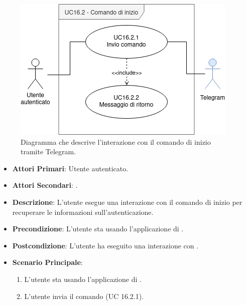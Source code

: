 	\begin{figure}[H]
		\centering
		\includegraphics[scale=0.60]{res/images/uc16.2}
		\caption{Diagramma che descrive l'interazione con il comando di inizio tramite Telegram.}
	\end{figure}

	\begin{itemize}
		\item \textbf{Attori Primari}: Utente autenticato.
		\item \textbf{Attori Secondari}: .
		\item \textbf{Descrizione}: L'utente esegue una interazione con il comando di inizio per recuperare le informazioni sull'autenticazione.
		\item \textbf{Precondizione}: L'utente sta usando l'applicazione di .
		\item \textbf{Postcondizione}: L'utente ha eseguito una interazione con .
		\item \textbf{Scenario Principale}:
		\begin{enumerate}
			\item L'utente sta usando l'applicazione di . 
			\item L'utente invia il comando (UC 16.2.1).
		\end{enumerate}
	\end{itemize}

